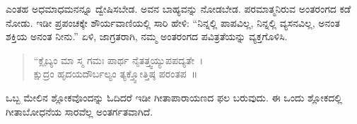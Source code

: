 ಎಂತಹ ಅಧಮಾಧಮನನ್ನೂ ದ್ವೇಷಿಸಬೇಡ. ಅವನ ಬಾಹ್ಯವನ್ನು ನೋಡಬೇಡ. ಪರಮಾತ್ಮನಿರುವ ಅಂತರಂಗದ ಕಡೆ ನೋಡು. ಇಡೀ ಪ್ರಪಂಚಕ್ಕೇ ಶೌರ್ಯವಾಣಿಯಲ್ಲಿ ಸಾರಿ ಹೇಳಿ: “ನಿನ್ನಲ್ಲಿ ಪಾಪವಿಲ್ಲ, ನಿನ್ನಲ್ಲಿ ವ್ಯಸನವಿಲ್ಲ, ಅನಂತ ಶಕ್ತಿಯ ಅನಂತ ನೀನು.” ಏಳಿ, ಜಾಗ್ರತರಾಗಿ, ನಮ್ಮ ಅಂತರಂಗದ ಪವಿತ್ರತೆಯನ್ನು ವ್ಯಕ್ತಗೊಳಿಸಿ.

\begin{verse}
“ಕ್ಲೈಬ್ಯಂ ಮಾ ಸ್ಮ ಗಮಃ ಪಾರ್ಥ ನೈತತ್ತ್ವಯ್ಯುಪಪದ್ಯತೇ~।\\ಕ್ಷುದ್ರಂ ಹೃದಯದೌರ್ಬಲ್ಯಂ ತ್ಯಕ್ತ್ವೋತ್ತಿಷ್ಠ ಪರಂತಪ~॥
\end{verse}

ಒಬ್ಬ ಮೇಲಿನ ಶ್ಲೋಕವೊಂದನ್ನು ಓದಿದರೆ ಇಡೀ ಗೀತಾಪಾರಾಯಣದ ಫಲ ಬರುವುದು. ಈ ಒಂದು ಶ್ಲೋಕದಲ್ಲಿ ಗೀತಾಬೋಧನೆಯ ಸಾರವೆಲ್ಲ ಅಂತರ್ಗತವಾಗಿದೆ.

